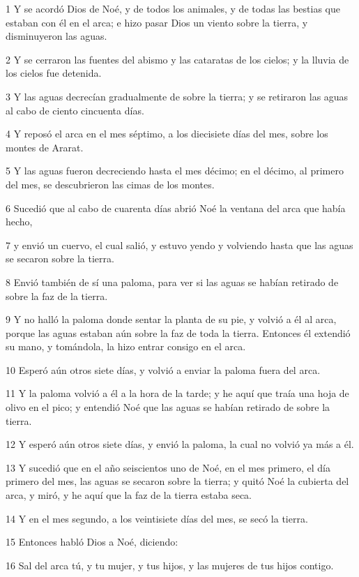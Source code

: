 \par 1 Y se acordó Dios de Noé, y de todos los animales, y de todas las bestias que estaban con él en el arca; e hizo pasar Dios un viento sobre la tierra, y disminuyeron las aguas.
\par 2 Y se cerraron las fuentes del abismo y las cataratas de los cielos; y la lluvia de los cielos fue detenida.
\par 3 Y las aguas decrecían gradualmente de sobre la tierra; y se retiraron las aguas al cabo de ciento cincuenta días.
\par 4 Y reposó el arca en el mes séptimo, a los diecisiete días del mes, sobre los montes de Ararat.
\par 5 Y las aguas fueron decreciendo hasta el mes décimo; en el décimo, al primero del mes, se descubrieron las cimas de los montes.
\par 6 Sucedió que al cabo de cuarenta días abrió Noé la ventana del arca que había hecho,
\par 7 y envió un cuervo, el cual salió, y estuvo yendo y volviendo hasta que las aguas se secaron sobre la tierra.
\par 8 Envió también de sí una paloma, para ver si las aguas se habían retirado de sobre la faz de la tierra.
\par 9 Y no halló la paloma donde sentar la planta de su pie, y volvió a él al arca, porque las aguas estaban aún sobre la faz de toda la tierra. Entonces él extendió su mano, y tomándola, la hizo entrar consigo en el arca.
\par 10 Esperó aún otros siete días, y volvió a enviar la paloma fuera del arca.
\par 11 Y la paloma volvió a él a la hora de la tarde; y he aquí que traía una hoja de olivo en el pico; y entendió Noé que las aguas se habían retirado de sobre la tierra.
\par 12 Y esperó aún otros siete días, y envió la paloma, la cual no volvió ya más a él.
\par 13 Y sucedió que en el año seiscientos uno de Noé, en el mes primero, el día primero del mes, las aguas se secaron sobre la tierra; y quitó Noé la cubierta del arca, y miró, y he aquí que la faz de la tierra estaba seca.
\par 14 Y en el mes segundo, a los veintisiete días del mes, se secó la tierra.
\par 15 Entonces habló Dios a Noé, diciendo:
\par 16 Sal del arca tú, y tu mujer, y tus hijos, y las mujeres de tus hijos contigo.
